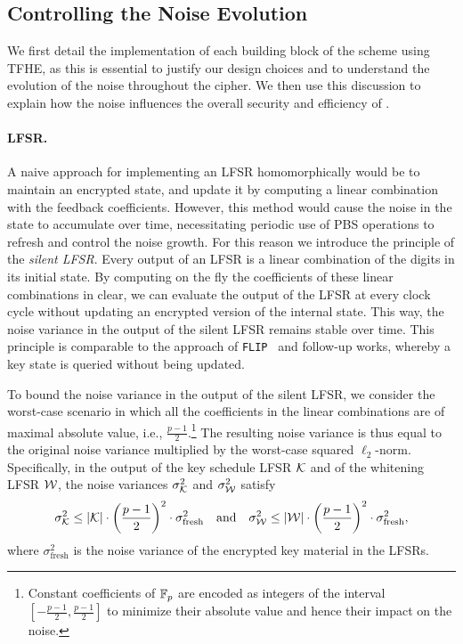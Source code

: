 
\subsection{Controlling the Noise Evolution}%
\label{sec:rationale-controllin-noise}

We first detail the implementation of each building block of the scheme using \gls{TFHE}, as this is essential to justify our design choices and to understand the evolution of the noise throughout the cipher. We then use this discussion to explain how the noise influences the overall security and efficiency of \coolName.

\paragraph{LFSR.} A naive approach for implementing an LFSR  homomorphically would be to maintain an encrypted state, and update it by computing a linear combination with the feedback coefficients. However, this method would cause the noise in the state to accumulate over time, necessitating periodic use of \gls{PBS} operations to refresh and control the noise growth. For this reason we introduce the principle of the \emph{silent LFSR}. Every output of an LFSR is a linear combination of the digits in its initial state. By computing on the fly the coefficients of these linear combinations in clear, we can evaluate the output of the LFSR at every clock cycle without updating an encrypted version of the internal state. This way, the noise variance in the output of the silent LFSR remains stable over time. This principle is comparable to the approach of {\tt FLIP}~\cite{EC:MJSC16} and follow-up works, whereby a key state is queried without being updated. 

To bound the noise variance in the output of the silent LFSR, we consider the worst-case scenario in which all the coefficients in the linear combinations are of maximal absolute value, i.e., $\frac{p-1}{2}$.\footnote{Constant coefficients of $\mathbb{F}_{p}$ are encoded as integers of the interval $[-\frac{p-1}{2}, \frac{p-1}{2}]$ to minimize their absolute value and hence their impact on the noise.} The resulting noise variance is thus equal to the original noise variance multiplied by the worst-case squared $\ell_2$-norm. Specifically, in the output of the key schedule LFSR $\mathcal{K}$ and of the whitening LFSR $\mathcal{W}$, the noise variances $\sigma_{\mathcal{K}}^2$ and $\sigma_{\mathcal{W}}^2$ satisfy
\begin{equation}
  \sigma_{\mathcal{K}}^2 \leq | \mathcal{K} | \cdot \left(\frac{p-1}2\right)^2 \cdot \sigma_{\text{fresh}}^2 ~~~\text{and}~~~ \sigma_{\mathcal{W}}^2 \leq | \mathcal{W} | \cdot \left(\frac{p-1}2\right)^2 \cdot \sigma_{\text{fresh}}^2,
\end{equation}
where $\sigma_{\text{fresh}}^2$ is the noise variance of the encrypted key material in the LFSRs.

